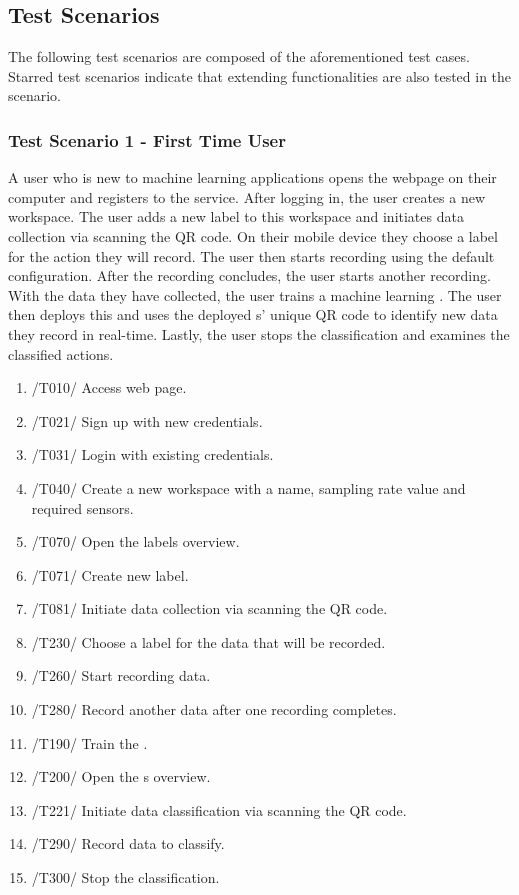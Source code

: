 \subsection{Test Scenarios}
The following test scenarios are composed of the aforementioned test cases. Starred test scenarios indicate that extending functionalities are also tested in the scenario.
\subsubsection{Test Scenario 1 - First Time User}
A user who is new to machine learning applications opens the webpage on their computer and registers to the service. After logging in, the user creates a new workspace. The user adds a new label to this workspace and initiates data collection via scanning the QR code. On their mobile device they choose a label for the action they will record. The user then starts recording using the default configuration. After the recording concludes, the user starts another recording. With the data they have collected, the user trains a machine learning . The user then deploys this  and uses the deployed s' unique \gls{QR code} to identify new data they record in real-time. Lastly, the user stops the \gls{classification} and examines the classified actions.
\begin{enumerate}
    \item /T010/ Access web page.
    \item /T021/ Sign up with new credentials.
    \item /T031/ Login with existing credentials.
    \item /T040/ Create a new \gls{workspace} with a name, sampling rate value and required \glspl{sensor}.
    \item /T070/ Open the labels overview.
    \item /T071/ Create new label.
    \item /T081/ Initiate data collection via scanning the \gls{QR code}.
    \item /T230/ Choose a \gls{label} for the data that will be recorded.
    \item /T260/ Start recording data.
    \item /T280/ Record another data after one recording completes.
    \item /T190/ Train the .
    \item /T200/ Open the s overview.
    \item /T221/ Initiate data \gls{classification} via scanning the \gls{QR code}.
    \item /T290/ Record data to classify.
    \item /T300/ Stop the \gls{classification}.
\end{enumerate}
